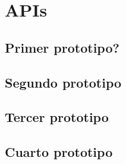\section{APIs}

\subsection{Primer prototipo?}
\subsection{Segundo prototipo}
\subsection{Tercer prototipo}
\subsection{Cuarto prototipo}